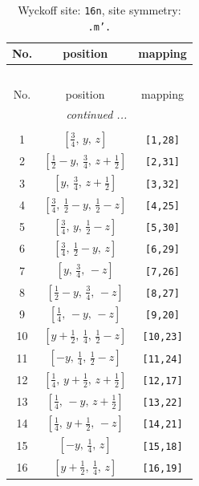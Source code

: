\documentclass[fleqn,8pt]{jsarticle}
\begin{document}
\renewcommand{\arraystretch}{1.2}
\begin{longtable}{ccc}
\caption{Wyckoff site: {\tt 16n}, site symmetry: {\tt .m'.}}
 \\
 \hline \hline
No. & position & mapping \\ \hline \endfirsthead

\multicolumn{2}{l}{\tablename\ \thetable{}} \\
 \hline \hline
No. & position & mapping \\ \hline \endhead

 \hline \hline
\multicolumn{2}{r}{\footnotesize\it continued ...} \\ \endfoot

 \hline \hline
\multicolumn{2}{r}{} \\ \endlastfoot

1 & $\left[ \frac{3}{4},\, y,\, z \right]$ & {\tt [1,28]} \\ \hline
2 & $\left[ \frac{1}{2} - y,\, \frac{3}{4},\, z + \frac{1}{2} \right]$ & {\tt [2,31]} \\ \hline
3 & $\left[ y,\, \frac{3}{4},\, z + \frac{1}{2} \right]$ & {\tt [3,32]} \\ \hline
4 & $\left[ \frac{3}{4},\, \frac{1}{2} - y,\, \frac{1}{2} - z \right]$ & {\tt [4,25]} \\ \hline
5 & $\left[ \frac{3}{4},\, y,\, \frac{1}{2} - z \right]$ & {\tt [5,30]} \\ \hline
6 & $\left[ \frac{3}{4},\, \frac{1}{2} - y,\, z \right]$ & {\tt [6,29]} \\ \hline
7 & $\left[ y,\, \frac{3}{4},\, - z \right]$ & {\tt [7,26]} \\ \hline
8 & $\left[ \frac{1}{2} - y,\, \frac{3}{4},\, - z \right]$ & {\tt [8,27]} \\ \hline
9 & $\left[ \frac{1}{4},\, - y,\, - z \right]$ & {\tt [9,20]} \\ \hline
10 & $\left[ y + \frac{1}{2},\, \frac{1}{4},\, \frac{1}{2} - z \right]$ & {\tt [10,23]} \\ \hline
11 & $\left[ - y,\, \frac{1}{4},\, \frac{1}{2} - z \right]$ & {\tt [11,24]} \\ \hline
12 & $\left[ \frac{1}{4},\, y + \frac{1}{2},\, z + \frac{1}{2} \right]$ & {\tt [12,17]} \\ \hline
13 & $\left[ \frac{1}{4},\, - y,\, z + \frac{1}{2} \right]$ & {\tt [13,22]} \\ \hline
14 & $\left[ \frac{1}{4},\, y + \frac{1}{2},\, - z \right]$ & {\tt [14,21]} \\ \hline
15 & $\left[ - y,\, \frac{1}{4},\, z \right]$ & {\tt [15,18]} \\ \hline
16 & $\left[ y + \frac{1}{2},\, \frac{1}{4},\, z \right]$ & {\tt [16,19]} \\
\end{longtable}
\end{document}

